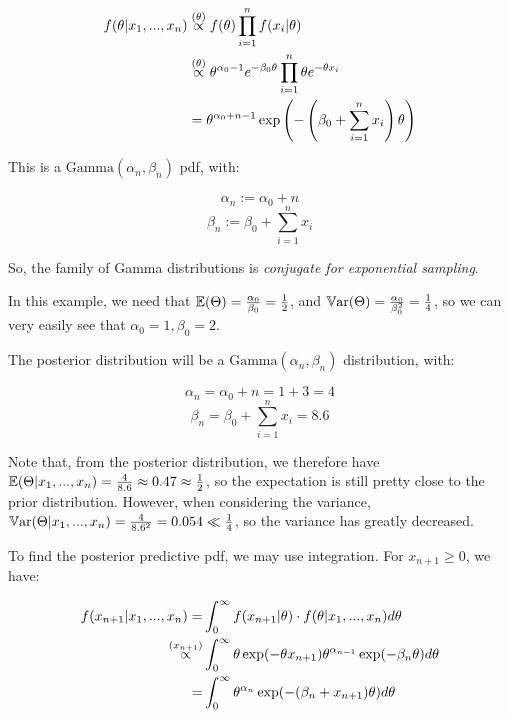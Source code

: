 \documentclass[a4paper]{article}
\begin{document}
                \begin{align*}
                    f(\theta | x_1, ..., x_n) & \stackrel{({\theta})}{\propto} f(\theta)
                        \prod_{i=1}^n f(x_i | \theta) \\
                    & \stackrel{({\theta})}{\propto} \theta^{\alpha_0 - 1} e^{-\beta_0\theta}
                        \prod_{i=1}^n \theta e^{-\theta x_i} \\
                    & = \theta^{\alpha_0 + n - 1} \exp\left(-\left(\beta_0 +
                        \sum_{i=1}^n x_i\right)\theta\right)
                \end{align*}

                This is a $\text{Gamma}(\alpha_n, \beta_n)$ pdf, with:

                \[
                    \alpha_n := \alpha_0 + n
                \]
                \[
                    \beta_n := \beta_0 + \sum_{i=1}^n x_i
                \]

                So, the family of Gamma distributions is \textit{conjugate for
                exponential sampling}.

                In this example, we need that $\mathbb{E}(\Theta) =
                \frac{\alpha_0}{\beta_0} = \frac{1}{2}$, and $\mathbb{V}\text{ar}(\Theta) =
                \frac{\alpha_0}{\beta_0^2} = \frac{1}{4}$, so we can very easily
                see that $\alpha_0 = 1, \beta_0 = 2$.

                The posterior distribution will be a $\text{Gamma}(\alpha_n,
                \beta_n)$ distribution, with:

                \[
                    \alpha_n = \alpha_0 + n = 1 + 3 = 4
                \]
                \[
                    \beta_n = \beta_0 + \sum_{i=1}^n x_i = 8.6
                \]

                Note that, from the posterior distribution, we therefore have
                $\mathbb{E}(\Theta | x_1, ..., x_n) = \frac{4}{8.6} \approx 0.47 \approx
                \frac{1}{2}$, so the expectation is still pretty close to the
                prior distribution. However, when considering the variance,
                $\mathbb{V}\text{ar}(\Theta | x_1, ..., x_n) = \frac{4}{8.6^2} = 0.054 \ll
                \frac{1}{4}$, so the variance has greatly decreased.

                To find the posterior predictive pdf, we may use integration.
                For $x_{n+1} \geq 0$, we have:

                \begin{align*}
                    f(x_{n+1} | x_1, ..., x_n) = & \int_0^\infty f(x_{n+1} |
                        \theta) \cdot f(\theta | x_1, ..., x_n) d\theta \\
                    \stackrel{({x_{n + 1}})}{\propto} & \int_0^\infty \theta \exp(-\theta
                        x_{n+1}) \theta^{\alpha_{n-1}} \exp(-\beta_n \theta)
                        d\theta \\
                    = & \int_0^\infty \theta^{\alpha_n} \exp(-(\beta_n +
                        x_{n+1})\theta) d\theta \\
                \end{align*}
\end{document}
